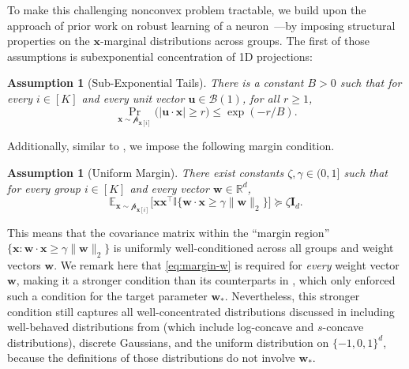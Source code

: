 \documentclass[11pt]{article}
\newcounter{thm}
\numberwithin{thm}{section}
\theoremstyle{plain}
\newtheorem{assumption}[thm]{Assumption}
\theoremstyle{definition}
\theoremstyle{remark} \newtheorem{remark}[thm]{Remark}
\def\vu{{\bm{u}}}
\def\vw{{\bm{w}}}
\def\vx{{\bm{x}}}
\def\pp{{\mathcal{p}}}
\def\mI{{\bm{I}}}
\def\cB{{\mathcal{B}}}
\newcommand{\E}{\mathbb{E}}
\newcommand{\R}{\mathbb{R}}
\newcommand{\Ind}{\mathbb{I}}
\begin{document}
To make this challenging nonconvex problem tractable, we build upon the approach of prior work on robust learning of a neuron~\citep{wang2023robustly-learning,Li2024shifts}---by imposing structural properties on the $\vx$-marginal distributions across groups. 
The first of those assumptions is subexponential concentration of 1D projections:
\begin{assumption}[Sub-Exponential Tails]\label{assump:concentration}
There is a constant \(B>0\) such that for every \(i \in [K]\) and every unit vector \(\vu \in \cB(1)\), for all \(r \ge 1\),
\[ \Pr_{\vx \sim \pp_{\vx[i]}}\bigl(|\vu \cdot \vx| \ge r\bigr) \le \exp(-r/B). \]
\end{assumption}
Additionally, similar to \citep{wang2023robustly-learning,Li2024shifts}, we impose the following margin condition. 
\begin{assumption}[Uniform Margin]\label{assump:margin}
There exist constants \(\zeta, \gamma \in (0,1]\) such that for every group \(i \in [K]\) and every vector \(\vw \in \R^d\),
\begin{equation}
    \E_{\vx \sim \pp_{\vx[i]}}\!\bigl[\vx\vx^\top \Ind\{\vw \cdot \vx \ge \gamma\|\vw\|_2\}\bigr] \succeq \zeta \mI_d. \label{eq:margin-w}
\end{equation}
\end{assumption}
This means that the covariance matrix within the ``margin region'' $\{\vx : \vw \cdot \vx \ge \gamma\|\vw\|_2\}$ is uniformly well-conditioned across all groups and weight vectors $\vw$. 
We remark here that \eqref{eq:margin-w} is required for \emph{every} weight vector $\vw$, making it a stronger condition than its counterparts in \citep{wang2023robustly-learning,Li2024shifts}, which only enforced such a condition for the target parameter $\vw_*$. Nevertheless, this stronger condition still captures all well-concentrated distributions discussed in \citep{wang2023robustly-learning} including well-behaved distributions from \citep{DKTZ22} (which  include log-concave and $s$-concave distributions), discrete Gaussians, and the uniform distribution on $\{-1, 0, 1\}^d$, because the definitions of those distributions do not involve $\vw_*$.
\end{document}
